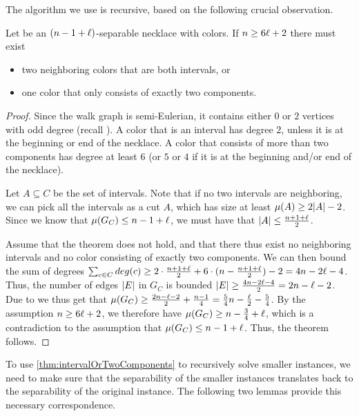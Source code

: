 \documentclass[a4paper,UKenglish,cleveref, thm-restate]{lipics-v2021}
\begin{document}
The algorithm we use is recursive, based on the following crucial observation.

\begin{theorem}
\label{thm:intervalOrTwoComponents}
Let \Colors be an $(\dimension -1 + \constB)$-separable necklace with \dimension colors. If $\dimension\geq 6 \constB +2$ there must exist
\begin{itemize}
    \item[(i)] two neighboring colors that are both intervals, or
    \item[(ii)] one color that only consists of exactly two components.
\end{itemize}
\end{theorem}

\begin{proof}
Since the walk graph is semi-Eulerian, it contains either $0$ or $2$ vertices with odd degree (recall ). A color that is an interval has degree $2$, unless it is at the beginning or end of the necklace. A color that consists of more than two components has degree at least $6$ (or $5$ or $4$ if it is at the beginning and/or end of the necklace).

Let $A\subseteq C$ be the set of intervals. Note that if no two intervals are neighboring, we can pick all the intervals as a cut $A$, which has size at least $\mu(A) \geq 2\lvert A \rvert-2$. Since we know that $\mu(G_C)\leq \dimension-1+\constB$, we must have that $\abs{A}\leq \frac{\dimension +1 +\constB}{2}$.

Assume that the theorem does not hold, and that there thus exist no neighboring intervals and no color consisting of exactly two components. We can then bound the sum of degrees 
$\sum_{c\in \Colors}deg(c)
\geq 2\cdot \frac{\dimension +1 +\constB}{2}
+ 6\cdot (\dimension - \frac{\dimension +1 +\constB}{2}) - 2 
= 4\dimension - 2 \constB - 4$. 
Thus, the number of edges $\lvert E \rvert$ in $G_C$ is bounded $\abs{E}\geq \frac{ 4\dimension - 2 \constB - 4}{2}=2\dimension -\constB -2$. 
Due to  we thus get that 
$\mu(G_C)\geq \frac{2 \dimension -\constB - 2}{2}+\frac{\dimension-1}{4}=\frac{5}{4}\dimension- \frac{\constB}{2} - \frac{5}{4}$. 
By the assumption $\dimension\geq 6\constB+2$, we therefore have $\mu(G_C)\geq \dimension - \frac{3}{4} + \constB$, which is a contradiction to the assumption that $\mu(G_C)\leq \dimension-1+\constB$. Thus, the theorem follows.
\end{proof}

To use  \cref{thm:intervalOrTwoComponents} to recursively solve smaller instances, we need to make sure that the separability of the smaller instances translates back to the separability of the original instance. The following two lemmas provide this necessary correspondence.
\end{document}
